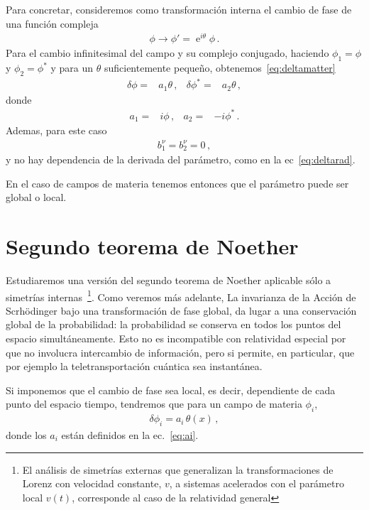 Para concretar, consideremos como transformación interna el cambio de fase de una función compleja
\begin{align}
  \phi\to \phi'=\operatorname{e}^{i\theta}\phi\,.
\end{align}
Para el cambio infinitesimal del campo y su complejo conjugado,  haciendo $\phi_1=\phi$ y $\phi_2=\phi^{*}$ y
para un $\theta$ suficientemente pequeño, obtenemos~\eqref{eq:deltamatter}
\begin{align}
  \delta\phi=&a_1 \theta\,, &  \delta\phi^{*}=&  a_2 \theta\,, 
\end{align}
donde
\begin{align}
  \label{eq:ai}
  a_1=& i\phi \,, & a_2=&-i\phi^{*}\,.
\end{align}
Ademas, para este caso
\begin{align}
  b_1^\nu=b_2^\nu=0\,,
\end{align}
y no hay dependencia de la derivada del parámetro, como en la ec~\eqref{eq:deltarad}.

En el caso de campos de materia tenemos entonces 
que el parámetro puede ser global o local.

\section{Segundo teorema de Noether}

Estudiaremos  una versión del segundo teorema de Noether aplicable sólo a simetrías internas~\footnote{El análisis de simetrías externas que generalizan la transformaciones de Lorenz con velocidad constante, $v$, a sistemas acelerados con el parámetro local $v(t)$, corresponde al caso de la relatividad general}. Como veremos más adelante, La invarianza de la Acción de Scrhödinger bajo una transformación de fase global, da lugar a una conservación global de la probabilidad: la probabilidad se conserva en todos los puntos del espacio simultáneamente. Esto no es incompatible con relatividad especial por que no involucra intercambio de información, pero si permite, en particular, que por ejemplo la teletransportación cuántica sea instantánea.

Si imponemos que el cambio de fase sea local, es decir, dependiente de cada punto  del espacio tiempo, tendremos que para un campo de materia $\phi_{i}$, 
\begin{align}
  \delta\phi_i=a_i\,\theta(x)\,,
\end{align}
donde los $a_i$ están definidos en la ec.~\eqref{eq:ai}.


